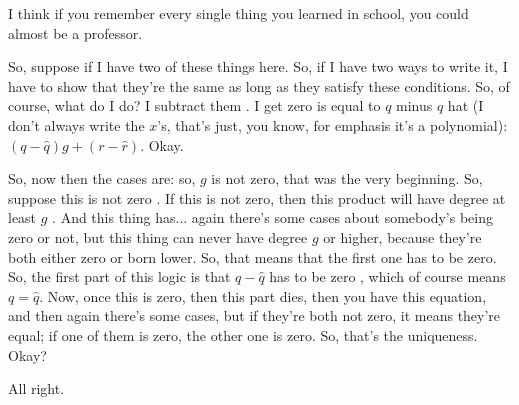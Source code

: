 \begin{speech}[00:30:46 - 00:32:21]
I think if you remember every single thing you learned in school, you could almost be a professor.

So, suppose if I have two of these things here. So, if I have two ways to write it, I have to show that they're the same as long as they satisfy these conditions. So, of course, what do I do? I subtract them . I get zero is equal to $q$ minus $q$ hat (I don't always write the $x$'s, that's just, you know, for emphasis it's a polynomial): $(q - \hat{q})g + (r - \hat{r})$. Okay.

So, now then the cases are: so, $g$ is not zero, that was the very beginning. So, suppose this is not zero . If this is not zero, then this product will have degree at least $g$ . And this thing has... again there's some cases about somebody's being zero or not, but this thing can never have degree $g$ or higher, because they're both either zero or born lower. So, that means that the first one has to be zero. So, the first part of this logic is that $q - \hat{q}$ has to be zero , which of course means $q = \hat{q}$. Now, once this is zero, then this part dies, then you have this equation, and then again there's some cases, but if they're both not zero, it means they're equal; if one of them is zero, the other one is zero. So, that's the uniqueness. Okay?

All right. 
\end{speech}

